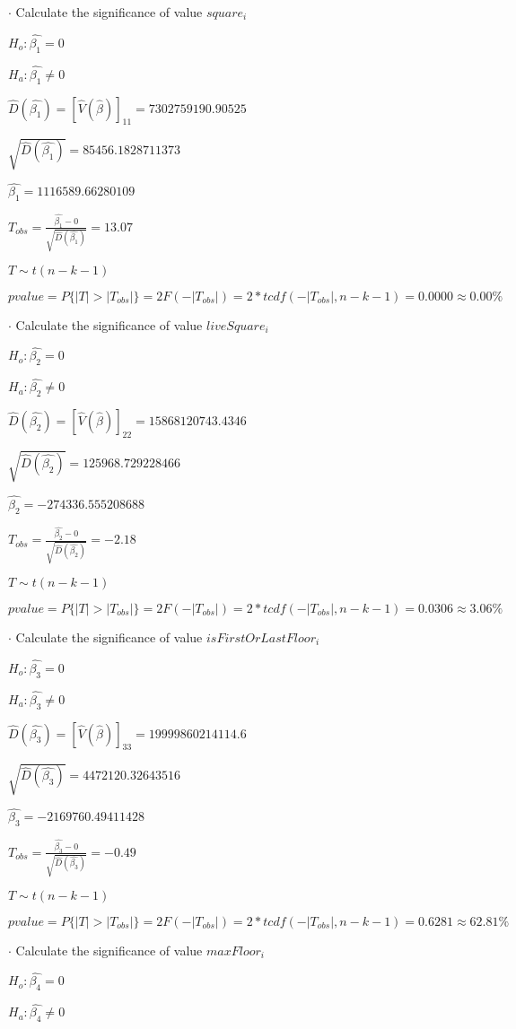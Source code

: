 \documentclass{article}
\begin{document}
$\cdot$ Calculate the significance of value $square_i$

$H_o: \hat{\beta_1}=0$

$H_a: \hat{\beta_1}\neq0$

$\hat{D}(\hat{\beta_1})=[\hat{V}(\hat{\beta})]_{1 1}=7302759190.90525$

$\sqrt{\hat{D}(\hat{\beta_1})}=85456.1828711373$

$\hat{\beta_1}=1116589.66280109$

$T_{obs}=\frac{\hat{\beta_1}-0}{\sqrt{\hat{D}(\hat{\beta_1})}}=13.07$

$T\sim t(n-k-1)$

$pvalue=P\{|T|>|T_{obs}|\}=2F(-|T_{obs}|)=2*tcdf(-|T_{obs}|, n-k-1)=0.0000\approx0.00\%$

$\cdot$ Calculate the significance of value $liveSquare_i$

$H_o: \hat{\beta_2}=0$

$H_a: \hat{\beta_2}\neq0$

$\hat{D}(\hat{\beta_2})=[\hat{V}(\hat{\beta})]_{2 2}=15868120743.4346$

$\sqrt{\hat{D}(\hat{\beta_2})}=125968.729228466$

$\hat{\beta_2}=-274336.555208688$

$T_{obs}=\frac{\hat{\beta_2}-0}{\sqrt{\hat{D}(\hat{\beta_2})}}=-2.18$

$T\sim t(n-k-1)$

$pvalue=P\{|T|>|T_{obs}|\}=2F(-|T_{obs}|)=2*tcdf(-|T_{obs}|, n-k-1)=0.0306\approx3.06\%$

$\cdot$ Calculate the significance of value $isFirstOrLastFloor_i$

$H_o: \hat{\beta_3}=0$

$H_a: \hat{\beta_3}\neq0$

$\hat{D}(\hat{\beta_3})=[\hat{V}(\hat{\beta})]_{3 3}=19999860214114.6$

$\sqrt{\hat{D}(\hat{\beta_3})}=4472120.32643516$

$\hat{\beta_3}=-2169760.49411428$

$T_{obs}=\frac{\hat{\beta_3}-0}{\sqrt{\hat{D}(\hat{\beta_3})}}=-0.49$

$T\sim t(n-k-1)$

$pvalue=P\{|T|>|T_{obs}|\}=2F(-|T_{obs}|)=2*tcdf(-|T_{obs}|, n-k-1)=0.6281\approx62.81\%$

$\cdot$ Calculate the significance of value $maxFloor_i$

$H_o: \hat{\beta_4}=0$

$H_a: \hat{\beta_4}\neq0$
\end{document}
